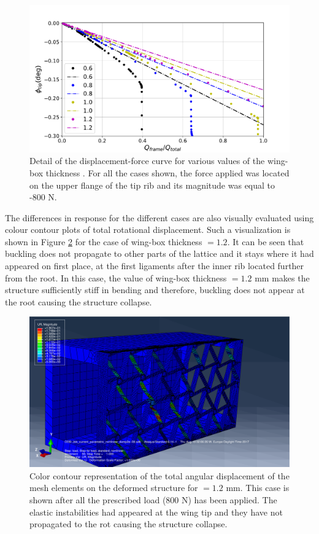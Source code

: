    \begin{figure}[!htpb] %
      \centering
      \includegraphics[width=0.8 \textwidth]{figures/result-sim/cbox/force_displacement-close}
      \caption[Detail of the displacement-force curve for various values of the wing-box thickness]{Detail of the displacement-force curve for various values of the wing-box thickness \boxt. For all the cases shown, the force applied was located on the upper flange of the tip rib and its magnitude was equal to -800 N.}\label{fig:forceDisplacement-close-Cbox_t}
    \end{figure}

    The differences in response for the different cases are also visually evaluated using colour contour plots of total rotational displacement. Such a visualization is shown in Figure \ref{fig:1coma2-800N-cbox_t} for the case of wing-box thickness \boxt$= 1.2$. It can be seen that buckling does not propagate to other parts of the lattice and it stays where it had appeared on first place, at the first ligaments after the inner rib located further from the root. In this case, the value of wing-box thickness \boxt$= 1.2$ mm makes the structure sufficiently stiff in bending and therefore, buckling does not appear at the root causing the structure collapse.

    \begin{figure}[!htpb] %
      \centering
      \includegraphics[width=0.8 \textwidth]{figures/result-sim/cbox/1coma4-800N}
      \caption[Color contour representation of the total angular displacement of the mesh elements on the deformed structure for \boxt$ = 1.2$ mm]{Color contour representation of the total angular displacement of the mesh elements on the deformed structure for \boxt$ = 1.2$ mm. This case is shown after all the prescribed load (800 N) has been applied. The elastic instabilities had appeared at the wing tip and they have not propagated to the rot causing the structure collapse.}\label{fig:1coma2-800N-cbox_t}
    \end{figure}

